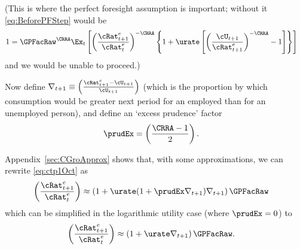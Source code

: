 \documentclass{\handout}
\begin{document}
(This is where the perfect foresight assumption is important; without it \eqref{eq:BeforePFStep} would be
\begin{equation}\begin{gathered}\begin{aligned}
 1       & =  \GPFacRaw^{\CRRA} \Ex_{t}\left[\left(\frac{{\cRat}^{e}_{t+1}}{{\cRat}^{e}_{t}}\right)^{-\CRRA} \left\{1+\urate\left[\left(\frac{\cU_{t+1}}{{\cRat}^{e}_{t+1}}\right)^{-\CRRA}-1\right]\right\}\right] \label{eq:BeforePFStepWithEx}
\end{aligned}\end{gathered}\end{equation}
and we would be unable to proceed.)

Now define $\nabla _{t+1} \equiv \left(\frac{{\cRat}^{e}_{t+1}-\cU_{t+1}}{\cU_{t+1}}\right)$ (which is the proportion by which consumption would be greater next period for an employed than for an unemployed person), and define an `excess prudence' factor
\begin{equation}\begin{gathered}\begin{aligned}
  \prudEx & =  \left(\frac{\CRRA-1}{2}\right).
\end{aligned}\end{gathered}\end{equation}

Appendix~\ref{sec:CGroApprox} shows that, with some approximations, we can rewrite \eqref{eq:ctp1Oct} as
\begin{equation}\begin{gathered}\begin{aligned}
         \left(\frac{{\cRat}^{e}_{t+1}}{{\cRat}^{e}_{t}}\right) & \approx  \left(1+ \urate (1+\prudEx\nabla _{t+1})\nabla _{t+1}\right) {\GPFacRaw}
         \label{eq:cedelapprox}
\end{aligned}\end{gathered}\end{equation}
which can be simplified in the logarithmic utility case (where $\prudEx = 0$) to
\begin{equation}\begin{gathered}\begin{aligned}
         \left(\frac{{\cRat}^{e}_{t+1}}{{\cRat}^{e}_{t}}\right) & \approx  \left(1+ \urate \nabla _{t+1}\right) {\GPFacRaw} \label{eq:cedelapproxLog}. 
\end{aligned}\end{gathered}\end{equation}
\end{document}
